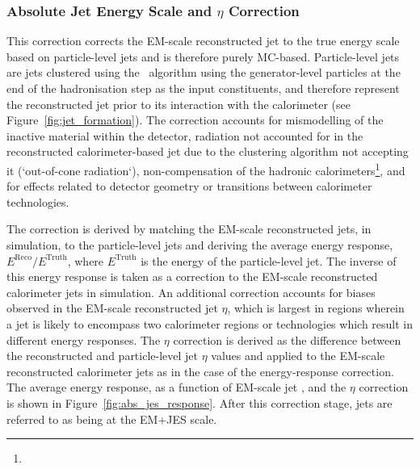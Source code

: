 \subsubsection{Absolute Jet Energy Scale and $\eta$ Correction}
\label{sec:jet_eta_corr}

This correction corrects the EM-scale reconstructed jet to the true energy scale based on particle-level
jets and is therefore purely MC-based.
Particle-level jets are jets clustered using the \antikt~algorithm using the generator-level
particles at the end of the hadronisation step as the input constituents, and therefore represent the reconstructed jet prior to
its interaction with the calorimeter (see Figure~\ref{fig:jet_formation}).
The correction accounts for mismodelling of the inactive material within the detector, radiation not accounted for
in the reconstructed calorimeter-based jet due to the clustering algorithm not accepting it (`out-of-cone radiation`),
non-compensation of the hadronic calorimeters\footnote{ {\color{red}{Compensating...}}}, and for effects
related to detector geometry or transitions between calorimeter technologies.

The correction is derived by matching the EM-scale reconstructed jets, in simulation, to the particle-level
jets and deriving the average energy response, $E^{\text{Reco}} / E^{\text{Truth}}$, where $E^{\text{Truth}}$ is the
energy of the particle-level jet.
The inverse of this energy response is taken as a correction to the EM-scale reconstructed calorimeter jets in simulation.
An additional correction accounts for biases observed in the EM-scale reconstructed jet $\eta$, which is largest
in regions wherein a jet is likely to encompass two calorimeter regions or technologies which result in different
energy responses.
The $\eta$ correction is derived as the difference between the reconstructed and particle-level jet $\eta$ values and
applied to the EM-scale reconstructed calorimeter jets as in the case of the energy-response correction.
The average energy response, as a function of EM-scale jet \pT, and the $\eta$ correction is shown
in Figure~\ref{fig:abs_jes_response}.
After this correction stage, jets are referred to as being at the EM+JES scale.

